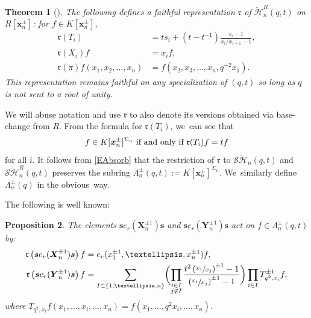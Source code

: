 \documentclass[11pt]{article}
\newtheorem{thm}{Theorem}[section]
\newtheorem{prop}[thm]{Proposition}
\theoremstyle{definition}
\newcommand{\SHH}{\mathcal{S}\ddot{\mathcal{H}}}
\newcommand{\HH}{\ddot{\mathcal{H}}}
\newcommand{\ee}{\boldsymbol{s}}
\newcommand{\xx}{\boldsymbol{x}}
\newcommand{\rrr}{\mathfrak{r}}
\begin{document}
\begin{thm}[{\cite[Th.\,2.3]{ChereAnnals}}]
The following defines a faithful representation $\mathfrak{r}$ of $\HH_{n}^R(q,t)$ on $R[\xx_n^\pm]$: for $f\in K[\xx_n^\pm]$,
\begin{align*}
\mathfrak{r}(T_i)&=ts_i+(t-t^{-1})\frac{s_i-1}{x_i/x_{i+1}-1},\\
\rrr(X_i)f&=x_if,\\
\rrr(\pi)f(x_1,x_2,\ldots, x_n)&=f(x_2,x_3,\ldots, x_n, q^{-2}x_1).
\end{align*}
This representation remains faithful on any specialization of $(q,t)$ so long as $q$ is not sent to a root of unity.
\end{thm}

We will abuse notation and use $\rrr$ to also denote its versions obtained via base-change from $R$.
From the formula for $\rrr(T_i)$, we~can see that
\[
f\in K[\xx_n^\pm]^{\Sigma_n}\hbox{ if and only if }\rrr(T_i)f=tf
\]
for all $i$.
It follows from \eqref{EAbsorb} that the restriction of $\rrr$ to $\SHH_{n}(q,t)$ and $\SHH_n^R(q,t)$ preserves the subring $\Lambda_n^\pm(q,t):=K[\xx_n^\pm]^{\Sigma_n}$. We~similarly define $\Lambda_n^\pm(q)$ in the obvious~way.

The following is well known:
\begin{prop}\label{MacGen}
The elements $\ee e_r(\boldsymbol{X}_n^{\pm 1})\ee$ and $\ee e_r(\boldsymbol{Y}_n^{\pm 1})\ee$ act on $f\in\Lambda^\pm_n(q,t)$ by:
\begin{align*}
\rrr\left(\ee e_r(\boldsymbol{X}_n^{\pm 1})\ee\right) f&=e_r(x_1^{\pm 1},\ldots, x_n^{\pm 1})f,\\
\rrr\left(\ee e_r(\boldsymbol{Y}_n^{\pm 1})\ee\right) f&=\sum_{I\subset\{1,\ldots, n\}}\biggl(\prod_{\substack{i\in I\\ j\not\in I}}\frac{t^2\left(\sfrac{x_i}{x_j}\right)^{\pm 1}-1}{\left(\sfrac{x_i}{x_j}\right)^{\pm 1}-1}\biggr)\prod_{i\in I}T_{q^2, x_i}^{\pm 1} f,
\end{align*}
where $T_{q^2, x_i}f(x_1,\ldots, x_i,\ldots,x_n)=f(x_1,\ldots, q^2x_i,\ldots, x_n)$.
\end{prop}
\end{document}

